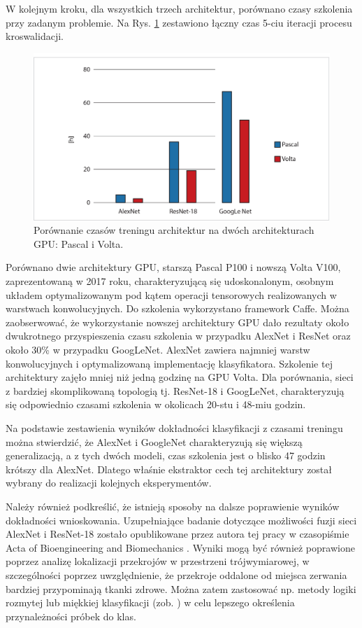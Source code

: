 W kolejnym kroku, dla wszystkich trzech architektur, porównano czasy szkolenia przy zadanym problemie. Na Rys. \ref{fig:training_times} zestawiono łączny czas 5-ciu iteracji procesu kroswalidacji.
\begin{figure}[h!]
	\includegraphics[width=\textwidth]{figures/TrainingtimesChart.jpg}
	\caption{Porównanie czasów treningu architektur na dwóch architekturach GPU: Pascal i Volta.}
	\label{fig:training_times}
\end{figure}
\newpage
Porównano dwie architektury GPU, starszą Pascal P100 i nowszą Volta V100, zaprezentowaną w 2017 roku, charakteryzującą się udoskonalonym, osobnym układem optymalizowanym pod kątem operacji tensorowych realizowanych \linebreak w warstwach konwolucyjnych. Do szkolenia wykorzystano framework Caffe. Można zaobserwować, że wykorzystanie nowszej architektury GPU dało rezultaty około dwukrotnego przyspieszenia czasu szkolenia w przypadku AlexNet i ResNet oraz około 30\% w przypadku GoogLeNet. AlexNet zawiera najmniej warstw konwolucyjnych i optymalizowaną implementację klasyfikatora. Szkolenie tej architektury zajęło mniej niż jedną godzinę na GPU Volta. Dla porównania, sieci z bardziej skomplikowaną topologią tj. ResNet-18 i GoogLeNet, charakteryzują się odpowiednio czasami szkolenia w okolicach 20-stu i 48-miu godzin. 

Na podstawie zestawienia wyników dokładności klasyfikacji z czasami treningu można stwierdzić, że AlexNet i GoogleNet charakteryzują się większą generalizacją, a z tych dwóch modeli, czas szkolenia jest o blisko 47 godzin krótszy dla AlexNet. Dlatego właśnie ekstraktor cech tej architektury został wybrany do realizacji kolejnych eksperymentów. 

Należy również podkreślić, że istnieją sposoby na dalsze poprawienie wyników dokładności wnioskowania. Uzupełniające badanie dotyczące możliwości fuzji sieci AlexNet i ResNet-18 zostało opublikowane przez autora tej pracy w czasopiśmie Acta of Bioengineering and Biomechanics \cite{Kapinski19}. Wyniki mogą być również poprawione poprzez analizę lokalizacji przekrojów w przestrzeni trójwymiarowej, w szczególności poprzez uwzględnienie, że przekroje oddalone od miejsca zerwania bardziej przypominają tkanki zdrowe. Można zatem zastosować np. metody logiki rozmytej lub miękkiej klasyfikacji (zob. \cite{Liu2011}) w celu lepszego określenia przynależności próbek do klas. 

